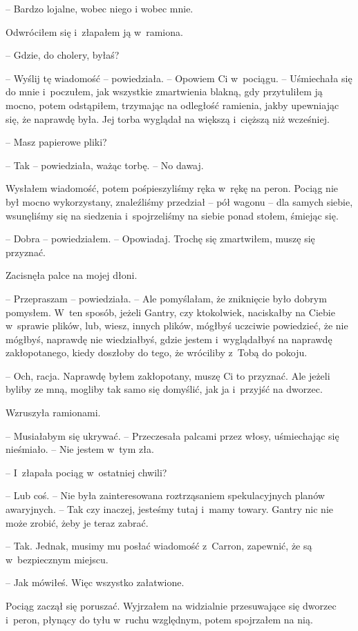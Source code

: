 \documentclass[oneside,polish,11pt,sfheadings]{mwbk}
\begin{document}
-- Bardzo lojalne, wobec niego
i wobec mnie.

Odwróciłem się i~złapałem ją w~ramiona. 

-- Gdzie, do cholery, byłaś?

-- Wyślij tę wiadomość -- powiedziała. -- Opowiem Ci w~pociągu. -- Uśmiechała się do mnie i~poczułem, jak wszystkie zmartwienia blakną, gdy
przytuliłem ją mocno, potem odstąpiłem, trzymając na odległość ramienia,
jakby upewniając się, że naprawdę była. Jej torba wyglądał na większą i~cięższą niż wcześniej.

-- Masz papierowe pliki?

-- Tak -- powiedziała, ważąc torbę. -- No dawaj.

Wysłałem wiadomość, potem pośpieszyliśmy ręka w~rękę na peron. Pociąg
nie był mocno wykorzystany, znaleźliśmy przedział -- pół wagonu -- dla
samych siebie, wsunęliśmy się na siedzenia i~spojrzeliśmy na siebie
ponad stołem, śmiejąc się.

-- Dobra -- powiedziałem. -- Opowiadaj. Trochę się zmartwiłem, muszę się
przyznać.

Zacisnęła palce na mojej dłoni. 

-- Przepraszam -- powiedziała. -- Ale
pomyślałam, że zniknięcie było dobrym pomysłem. W~ten sposób, jeżeli
Gantry, czy ktokolwiek, naciskałby na Ciebie w~sprawie plików, lub,
wiesz, innych plików, mógłbyś uczciwie powiedzieć, że nie mógłbyś,
naprawdę nie wiedziałbyś, gdzie jestem i~wyglądałbyś na naprawdę
zakłopotanego, kiedy doszłoby do tego, że wróciliby z~Tobą do pokoju.

-- Och, racja. Naprawdę byłem zakłopotany, muszę Ci to przyznać. Ale
jeżeli byliby ze mną, mogliby tak samo się domyślić, jak ja i~przyjść na
dworzec.

Wzruszyła ramionami. 

-- Musiałabym się ukrywać. -- Przeczesała palcami
przez włosy, uśmiechając się nieśmiało. -- Nie jestem w~tym zła.

-- I~złapała pociąg w~ostatniej chwili?

-- Lub coś. -- Nie była zainteresowana roztrząsaniem spekulacyjnych planów
awaryjnych. -- Tak czy inaczej, jesteśmy tutaj i~mamy towary. Gantry nic
nie może zrobić, żeby je teraz zabrać.

-- Tak. Jednak, musimy mu posłać wiadomość z~Carron, zapewnić, że są w~bezpiecznym miejscu.

-- Jak mówiłeś. Więc wszystko załatwione.

Pociąg zaczął się poruszać. Wyjrzałem na widzialnie przesuwające się
dworzec i~peron, płynący do tyłu w~ruchu względnym, potem spojrzałem na
nią.
\end{document}
